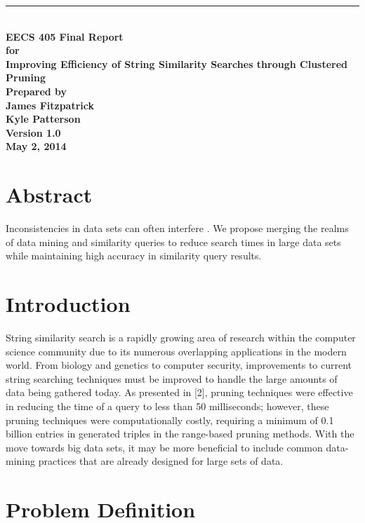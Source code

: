\documentclass[pdftex,12pt,letter]{article}
\newcommand{\HRule}{\rule{\linewidth}{0.5mm}}
\begin{document}
\begin{titlepage}
\begin{flushright}
\HRule \\[0.4cm]
{ \bfseries
{\huge EECS 405 Final Report\\[1cm]}
{\Large for\\[1cm]}
{\large Improving Efficiency of String Similarity Searches through Clustered Pruning\\[3cm]}
{\large Prepared by\\[1cm]James Fitzpatrick\\Kyle Patterson\\[2cm]
Version 1.0\\
May 2, 2014\\
}}
\end{flushright}
\end{titlepage}

\tableofcontents
\newpage

\section{Abstract}
Inconsistencies in data sets can often interfere . We propose merging the realms of data mining and similarity queries to reduce search times in large data sets while maintaining high accuracy in similarity query results.

\section{Introduction}
String similarity search is a rapidly growing area of research within the computer science community due to its numerous overlapping applications in the modern world. From biology and genetics to computer security, improvements to current string searching techniques must be improved to handle the large amounts of data being gathered today.  As presented in [2], pruning techniques were effective in reducing the time of a query to less than 50 milliseconds; however, these pruning techniques were computationally costly, requiring a minimum of 0.1 billion entries in generated triples in the range-based pruning methods. With the move towards big data sets, it may be more beneficial to include common data-mining practices that are already designed for large sets of data.

\section{Problem Definition}
\end{document}
